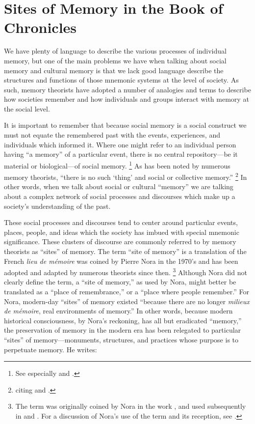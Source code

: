 
\section{Sites of Memory in the Book of Chronicles}

We have plenty of language to describe the various processes of individual memory, but one of the main problems we have when talking about social memory and cultural memory is that we lack good language describe the structures and functions of those mnemonic systems at the level of society. As such, memory theorists have adopted a number of analogies and terms to describe how societies remember and how individuals and groups interact with memory at the social level. 

It is important to remember that because social memory is a social construct we must not equate the remembered past with the events, experiences, and individuals which informed it. Where one might refer to an individual person having ``a memory'' of a particular event, there is no central repository---be it material or biological---of social memory.%
    \footnote{See especially \cite{brockmeier_cp2010} and \cite{wertsch_cp2011}.}  
As has been noted by numerous memory theorists, ``there is no such `thing' and social or collective memory.''%
    \footnote{\cite[14]{wilson2017} citing \cite[112]{olick-robbins_ars1998} and \cite[118--24]{wertsch_boyer-wertsch2009}.}
In other words, when we talk about social or cultural ``memory'' we are talking about a complex network of social processes and discourses which make up a society's understanding of the past.

These social processes and discourses tend to center around particular events, places, people, and ideas which the society has imbued with special mnemonic significance. These clusters of discourse are commonly referred to by memory theorists as ``sites'' of memory. The term ``site of memory'' is a translation of the French \emph{lieu de mémoire} was coined by Pierre Nora in the 1970's and has been adopted and adapted by numerous theorists since then.%
    \footnote{%
        The term was originally coined by Nora in the work
        \cite*{nora_goff-etal1978}, and used subsequently in 
        \cite*{nora1984} and 
        \cite*{nora_representations1989}. For a discussion of Nora's use of the term and its reception, see 
        \cite{szpociński_teksty-drugie2016}.}
Although Nora did not clearly define the term, a ``site of memory,'' as used by Nora, might better be translated as a ``place of remembrance,'' or a ``place where people remember.'' For Nora, modern-day ``sites'' of memory existed ``because there are no longer \emph{milieux de mémoire}, real environments of memory.''%
    \autocite[7]{nora_representations1989}
In other words, because modern historical consciousness, by Nora's reckoning, has all but eradicated ``memory,'' the preservation of memory in the modern era has been relegated to particular ``sites'' of memory---monuments, structures, and practices whose purpose is to perpetuate memory. He writes:

